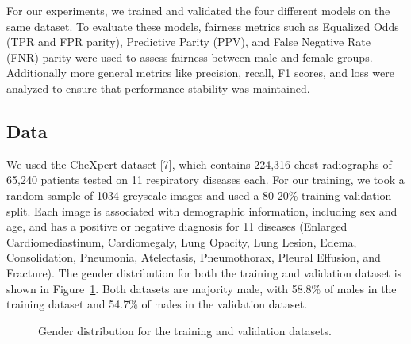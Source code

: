 \documentclass[11pt]{article}
\begin{document}
For our experiments, we trained and validated the four different models on the same dataset. To evaluate these models, fairness metrics such as Equalized Odds (TPR and FPR parity), Predictive Parity (PPV), and False Negative Rate (FNR) parity were used to assess fairness between male and female groups. Additionally more general metrics like precision, recall, F1 scores, and loss were analyzed to ensure that performance stability was maintained.

\subsection{Data}

We used the CheXpert dataset [7], which contains 224,316 chest radiographs of 65,240 patients tested on 11 respiratory diseases each. For our training, we took a random sample of 1034 greyscale images and used a 80-20\% training-validation split. Each image is associated with demographic information, including sex and age, and has a positive or negative diagnosis for 11 diseases (Enlarged Cardiomediastinum, Cardiomegaly, Lung Opacity, Lung Lesion, Edema, Consolidation, Pneumonia, Atelectasis, Pneumothorax, Pleural Effusion, and Fracture). The gender distribution for both the training and validation dataset is shown in Figure~\ref{fig:gender_dist}. Both datasets are majority male, with 58.8\% of males in the training dataset and 54.7\% of males in the validation dataset.

\begin{figure}[H]
\centering
{}
\caption{Gender distribution for the training and validation datasets.}
\label{fig:gender_dist}
\end{figure}
\end{document}
